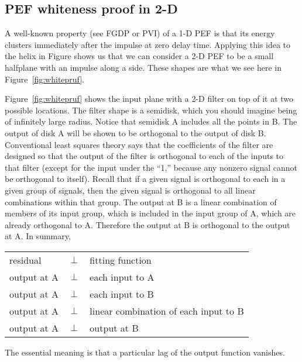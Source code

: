 \subsection{PEF whiteness proof in 2-D}
\par
{}
A well-known property (see FGDP or PVI)
of a 1-D PEF is that its energy clusters immediately after the
impulse at zero delay time.
Applying this idea to
the helix in Figure %
shows us that we can consider a 2-D PEF
to be a small halfplane %
with an impulse along a side.
These shapes are what we see here in
Figure~\ref{fig:whitepruf}.


\par
Figure~\ref{fig:whitepruf} shows the input plane with a 2-D filter on top
of it at two possible locations.
The filter shape is a semidisk,
which you should imagine being of
infinitely large radius.
Notice that semidisk A includes all the points in B.
The output of disk A will be shown to be orthogonal to the output
of disk B.
Conventional least squares theory says that the coefficients of the filter
are designed so that the output of the filter
is orthogonal to each of the inputs to that filter
(except for the input under the ``1,''
because any nonzero signal cannot be orthogonal to itself).
Recall that if a given signal is orthogonal to each in a given group of signals,
then the given signal is orthogonal
to all linear combinations within that group.
The output at B is a linear combination of members
of its input group,
which is included in the input group of A,
which are already orthogonal to A.
Therefore the output at B is orthogonal to the output at A.
In summary,
\par            %
\begin{tabular}{lll}
residual     & $\perp$ &  fitting function \\
output at A  & $\perp$ &  each input to A \\
output at A  & $\perp$ &  each input to B \\
output at A  & $\perp$ &  linear combination of each input to B \\
output at A  & $\perp$ &  output at B
\end{tabular}
\par            %
\noindent
The essential meaning is that
a particular lag of the output  function vanishes.

